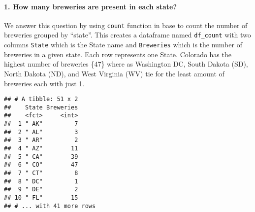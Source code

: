 \documentclass[]{article}
\newenvironment{Shaded}{\begin{snugshade}}{\end{snugshade}}
\newcommand{\CommentTok}[1]{\textcolor[rgb]{0.56,0.35,0.01}{\textit{#1}}}
\newcommand{\DataTypeTok}[1]{\textcolor[rgb]{0.13,0.29,0.53}{#1}}
\newcommand{\DecValTok}[1]{\textcolor[rgb]{0.00,0.00,0.81}{#1}}
\newcommand{\KeywordTok}[1]{\textcolor[rgb]{0.13,0.29,0.53}{\textbf{#1}}}
\newcommand{\NormalTok}[1]{#1}
\newcommand{\OperatorTok}[1]{\textcolor[rgb]{0.81,0.36,0.00}{\textbf{#1}}}
\newcommand{\OtherTok}[1]{\textcolor[rgb]{0.56,0.35,0.01}{#1}}
\newcommand{\StringTok}[1]{\textcolor[rgb]{0.31,0.60,0.02}{#1}}
\let\oldparagraph\paragraph
\renewcommand{\paragraph}[1]{\oldparagraph{#1}\mbox{}}
\begin{document}
\hypertarget{how-many-breweries-are-present-in-each-state}{%
\paragraph{1. How many breweries are present in each
state?}\label{how-many-breweries-are-present-in-each-state}}

We answer this question by using \texttt{count} function in base to
count the number of breweries grouped by ``state''. This creates a
dataframe named \texttt{df\_count} with two columns \texttt{State} which
is the State name and \texttt{Breweries} which is the number of
breweries in a given state. Each row represents one State. Colorado has
the highest number of breweries \{47\} where as Washington DC, South
Dakota (SD), North Dakota (ND), and West Virginia (WV) tie for the least
amount of breweries each with just 1.

\begin{Shaded}
\end{Shaded}

\begin{verbatim}
## # A tibble: 51 x 2
##    State Breweries
##    <fct>     <int>
##  1 " AK"         7
##  2 " AL"         3
##  3 " AR"         2
##  4 " AZ"        11
##  5 " CA"        39
##  6 " CO"        47
##  7 " CT"         8
##  8 " DC"         1
##  9 " DE"         2
## 10 " FL"        15
## # ... with 41 more rows
\end{verbatim}
\end{document}

